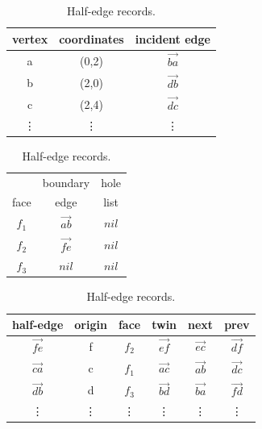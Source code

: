 \begin{table} \label{tab:records}
\begin{minipage}{0.3\textwidth}
    \centering
    \begin{tabular}{c c c}
        \toprule
        vertex & coordinates & incident edge \\
        \midrule
        a      & (0,2)  & $\vec{ba}$ \\
        b      & (2,0)  & $\vec{db}$ \\
        c      & (2,4)  & $\vec{dc}$ \\
        \vdots & \vdots & \vdots     \\
        \bottomrule
    \end{tabular}
    \caption{Vertex records.}\label{tab:vertices}
\end{minipage}\hfill %
\begin{minipage}{0.3\textwidth}
    \centering
    \begin{tabular}{c c c} 
        \toprule
             & boundary  & hole\\
        face & edge      & list\\
        \midrule
        $f_1$ & $\vec{ab}$ & $nil$ \\
        $f_2$ & $\vec{fe}$ & $nil$ \\
        $f_3$ & $nil$      & $nil$ \\
        \bottomrule
    \end{tabular}
    \caption{Face records.}\label{tab:faces}
\end{minipage}\hfill %
\begin{minipage}{0.4\textwidth}
    \centering
    \begin{tabular}{c c c c c c} 
        \toprule
        half-edge & origin & face & twin & next & prev \\
        \midrule
        $\vec{fe}$ & f & $f_2$  & $\vec{ef}$ & $\vec{ec}$ & $\vec{df}$ \\
        $\vec{ca}$ & c & $f_1$  & $\vec{ac}$ & $\vec{ab}$ & $\vec{dc}$ \\
        $\vec{db}$ & d & $f_3$  & $\vec{bd}$ & $\vec{ba}$ & $\vec{fd}$ \\
        \vdots     & \vdots & \vdots & \vdots     & \vdots     & \vdots     \\
        \bottomrule
    \end{tabular}
    \caption{Half-edge records.}\label{tab:hedges}
\end{minipage}
\end{table}

